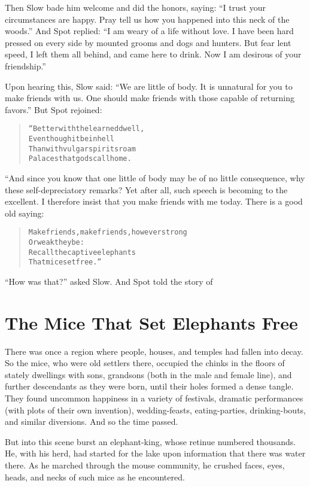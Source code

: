 \documentclass[article, twoside, 14pt]{memoir}
\renewenvironment{verbatim}{%
\begin{quote}%
\vskip -10pt%
\begin{alltt}\normalfont\large}{\end{alltt}%
\end{quote}%
\vskip -10pt
} %
\begin{document}
Then Slow bade him welcome and did the honors, saying:
``I trust your circumstances are happy. Pray tell us how you happened into this neck of the woods.''
And Spot replied:
``I am weary of a life without love. I have been hard pressed on every side by mounted grooms and dogs and hunters. But fear lent speed, I left them all behind, and came here to drink. Now I am desirous of your friendship.''

Upon hearing this, Slow said:
``We are little of body. It is unnatural for you to make friends with us. One should make friends with those capable of returning favors.''
But Spot rejoined:

\begin{verbatim}
“Better with the learned dwell,
Even though it be in hell
Than with vulgar spirits roam
Palaces that gods call home.
\end{verbatim}
“And since you know that one little of body may be of no little
consequence, why these self-depreciatory remarks? Yet after all,
such speech is becoming to the excellent. I therefore insist that
you make friends with me today. There is a good old saying:

\begin{verbatim}
Make friends, make friends, however strong
    Or weak they be:
Recall the captive elephants
    That mice set free.”
\end{verbatim}
``How was that?'' asked Slow. And Spot told the story of

\chapter{The Mice That Set Elephants Free}

\label{s44}

There was once a region where people, houses, and temples had
fallen into decay. So the mice, who were old settlers there,
occupied the chinks in the floors of stately dwellings with sons,
grandsons (both in the male and female line), and further
descendants as they were born, until their holes formed a dense
tangle. They found uncommon happiness in a variety of festivals,
dramatic performances (with plots of their own invention),
wedding-feasts, eating-parties, drinking-bouts, and similar
diversions. And so the time passed.

But into this scene burst an elephant-king, whose retinue numbered
thousands. He, with his herd, had started for the lake upon
information that there was water there. As he marched through the
mouse community, he crushed faces, eyes, heads, and necks of
such mice as he encountered.
\end{document}
